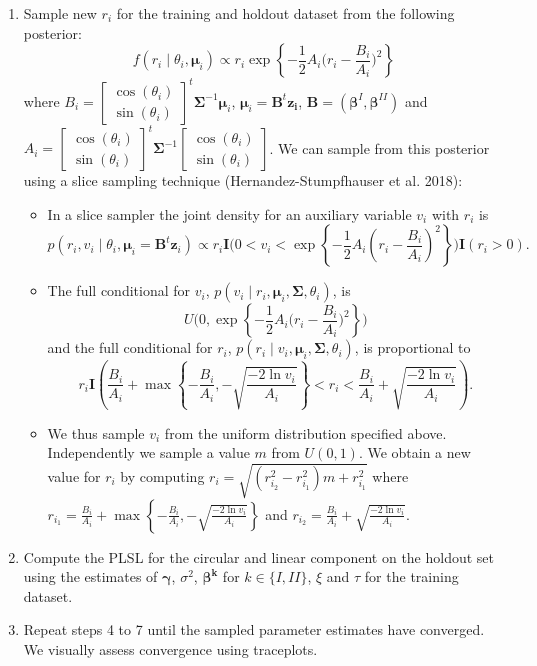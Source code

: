 \documentclass[12pt,]{article}
\begin{document}
\begin{enumerate}
\item Sample new $r_i$ for the training and holdout dataset from the following posterior:
$$f(r_i \mid \theta_i, \boldsymbol{\mu}_i) \propto r_i \exp{\left\{-\frac{1}{2}A_i\bigg(r_i-\frac{B_i}{A_i}\bigg)^2\right\}}$$ 
where $B_i = \begin{bmatrix} \cos (\theta_i) \\ \sin (\theta_i)\end{bmatrix}^t\boldsymbol{\Sigma}^{-1}\boldsymbol{\mu}_i$, $\boldsymbol{\mu}_i = \boldsymbol{B}^t\boldsymbol{z_i}$, $\boldsymbol{B} = (\boldsymbol{\beta}^{I}, \boldsymbol{\beta}^{II})$ and $A_i = \begin{bmatrix} \cos (\theta_i) \\ \sin (\theta_i)\end{bmatrix}^t\boldsymbol{\Sigma}^{-1}\begin{bmatrix} \cos (\theta_i) \\ \sin (\theta_i)\end{bmatrix}$.
\noindent We can sample from this posterior using a slice sampling technique (Hernandez-Stumpfhauser et al. 2018):

\begin{itemize}
\item In a slice sampler the joint density for an auxiliary variable $v_{i}$ with $r_{i}$ is
$$p(r_{i}, v_{i}\mid \theta_{i}, \boldsymbol{\mu}_{i}=\boldsymbol{B}^t\boldsymbol{z}_{i}) \propto r_{i} \textbf{I}\bigg(0 < v_i < \exp\left\{ -\frac{1}{2} A_i\left(r_{i} - \frac{B_i}{A_i}\right)^2\right\}\bigg)\textbf{I}(r_i > 0).$$
\item The full conditional for $v_{i}$, $p(v_{i} \mid r_{i},\boldsymbol{\mu}_{i}, \boldsymbol{\Sigma}, \theta_{i})$, is
$$U\Bigg(0, \exp\left\{-\frac{1}{2}A_i\bigg(r_i -  \frac{B_{i}}{A_i}\bigg)^2\right\}\Bigg)$$
and the full conditional for $r_i$, $p(r_{i} \mid v_{i},\boldsymbol{\mu}_{i}, \boldsymbol{\Sigma}, \theta_{i})$, is proportional to
$$r_{i} \textbf{I}\left(\frac{B_i}{A_i} + \max\left\{-\frac{B_i}{A_i}, -\sqrt{\frac{-2\ln v_{i}}{A_i}}\right\} < r_{i} < \frac{B_i}{A_i} + \sqrt{\frac{-2\ln v_{i}}{A_i}}\right).$$
\item We thus sample $v_{i}$ from the uniform distribution specified above. Independently we sample a value $m$ from $U(0,1)$. We obtain a new value for $r_{i}$ by computing $r_{i} = \sqrt{(r_{i_{2}}^{2}-r_{i_{1}}^{2})m + r_{i_{1}}^{2}}$ where $r_{i_{1}}=\frac{B_i}{A_i} +\max\left\{-\frac{B_i}{A_i}, -\sqrt{\frac{-2\ln v_{i}}{A_i}}\right\}$ and $ r_{i_{2}}= \frac{B_i}{A_i} + \sqrt{\frac{-2\ln v_{i}}{A_i}}$.
\end{itemize}

\item Compute the PLSL for the circular and linear component on the holdout set using the estimates of $\boldsymbol{\gamma}$, $\sigma^2$, $\boldsymbol{\beta^{k}}$ for $k \in \{I,II\}$, $\xi$ and $\tau$ for the training dataset. 
\item Repeat steps 4 to 7 until the sampled parameter estimates have converged. We visually assess convergence using traceplots.
\end{enumerate}
\end{document}
